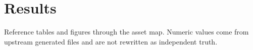 \section{Results}

Reference tables and figures through the asset map. Numeric values come from
upstream generated files and are not rewritten as independent truth.
